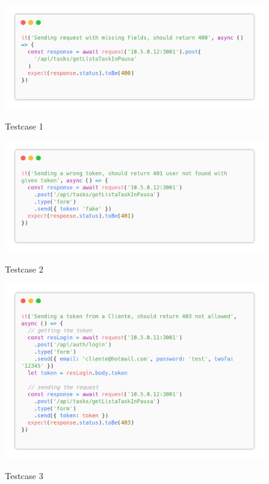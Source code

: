 \documentclass{report}
\begin{document}
\begin{figure}[H]
	\centering\includegraphics[width=1\textwidth]{images/code_in_pausa_test1.png}
	
	Testcase 1
\end{figure}
\begin{figure}[H]
	\centering\includegraphics[width=1\textwidth]{images/code_in_pausa_test2.png}
	
	Testcase 2
\end{figure}
\begin{figure}[H]
	\centering\includegraphics[width=1\textwidth]{images/code_in_pausa_test3.png}
	
	Testcase 3
\end{figure}
\end{document}
